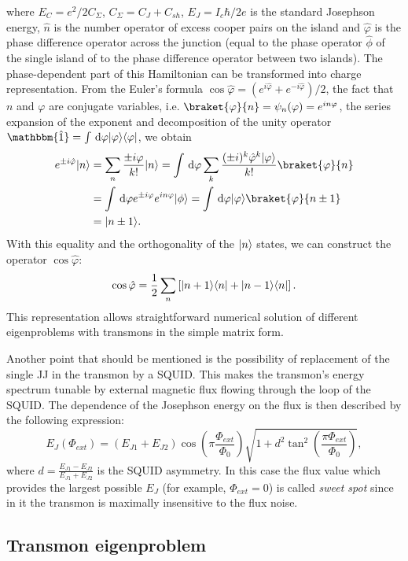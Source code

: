 \documentclass[12pt, twoside]{report}
\newcommand{\diff}{\,\mathrm{d}}
\DeclarePairedDelimiter\bra{\langle}{\rvert}
\DeclarePairedDelimiter\ket{\lvert}{\rangle}
\newcommand{\rbrkt}[1]{\left( #1 \right)}
\newcommand{\sbrkt}[1]{\left[ #1 \right]}
\numberwithin{equation}{section}
\begin{document}
where $E_C = e^2/2C_\Sigma$, $C_\Sigma = C_J+C_{sh}$, $E_J = I_c \hbar/2e$ is the standard Josephson energy, $\hat n$ is the number operator of excess cooper pairs on the island and $\hat \varphi$ is the phase difference operator across the junction (equal to the phase operator $\hat \phi$ of the single island of to the phase difference operator between two islands\cite{Devoret1995}). The phase-dependent part of this Hamiltonian can be transformed into charge representation. From the Euler's formula $\cos \hat \varphi = (e^{i\hat\varphi} + e^{-i\hat\varphi})/2$, the fact that $n$ and $\varphi$ are conjugate variables, i.e. $\braket{\varphi}{n} = \psi_n(\varphi) = e^{i n \varphi}$, the series expansion of the exponent and decomposition of the unity operator $\mathbbm{\hat 1} = \int \diff \varphi \ket{\varphi}\bra{\varphi}$, we obtain
\[
\begin{aligned}
e^{\pm i \hat \varphi}\ket{n} &= \sum_n \frac{\pm i\varphi}{k!}\ket{n} = \int \diff \varphi \sum_k \frac{(\pm i)^k \hat\varphi^k \ket{\varphi}}{k!}\braket{\varphi}{n}\\
&=  \int \diff \varphi e^{\pm i\varphi} e^{i n \varphi} \ket{\phi} = \int \diff \varphi \ket{\varphi}\braket{\varphi}{n\pm1}\\
&= \ket{n\pm1}.
\end{aligned}
\]
With this equality and the orthogonality of the $\ket{n}$ states, we can construct the operator $\cos\hat\varphi$:
\[
\cos\hat\varphi = \frac{1}{2}\sum_n\sbrkt{\ket{n+1}\bra{n} + \ket{n-1}\bra{n}}.
\]
This representation allows straightforward numerical solution of different eigenproblems with transmons in the simple matrix form.

Another point that should be mentioned is the possibility of replacement of the single JJ in the transmon by a SQUID. This makes the transmon's energy spectrum tunable by external magnetic flux flowing through the loop of the SQUID. The dependence of the Josephson energy on the flux is then described by the following expression\cite{Koch2007}:
\[
E_J(\Phi_{ext}) = (E_{J1} + E_{J2})\cos\rbrkt{\pi\frac{\Phi_{ext}}{\Phi_0}}\sqrt{1+d^2\tan^2\rbrkt{\frac{\pi\Phi_{ext}}{\Phi_0}}},
\]
where $d = \frac{E_{J1} - E_{J2}}{E_{J1} + E_{J2}}$ is the SQUID asymmetry. In this case the flux value which provides the largest possible $E_J$ (for example, $\Phi_{ext} = 0$) is called \textit{sweet spot} since in it the transmon is maximally insensitive to the flux noise.


\subsection{Transmon eigenproblem}\label{sec:tr_eigen}
\end{document}
